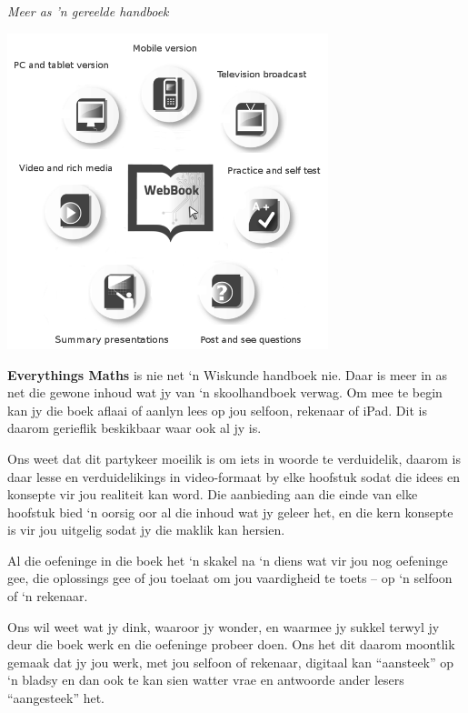 
\newpage
\thispagestyle{empty}

{\normalfont\sffamily\fontsize{22}\normalfont\itshape Meer as 'n gereelde handboek} \par

\begin{center}
\includegraphics[width=0.70\textwidth]{title_images/morethantextbook.png}
\end{center}

\par
{
\textbf{Everythings Maths} is nie net ‘n Wiskunde handboek nie. Daar is meer in as net die gewone inhoud wat jy van ‘n skoolhandboek verwag. Om mee te begin kan jy die boek aflaai of aanlyn lees op jou selfoon, rekenaar of iPad. Dit is daarom gerieflik beskikbaar waar ook al jy is.\par

Ons weet dat dit partykeer moeilik is om iets in woorde te verduidelik, daarom is daar lesse en verduidelikings in video-formaat by elke hoofstuk sodat die idees en konsepte vir jou realiteit kan word. Die aanbieding aan die einde van elke hoofstuk bied ‘n oorsig oor al die inhoud wat jy geleer het, en die kern konsepte is vir jou uitgelig sodat jy die maklik kan hersien. \par

Al die oefeninge in die boek het ‘n skakel na ‘n diens wat vir jou nog oefeninge gee, die oplossings gee of jou toelaat om jou vaardigheid te toets – op ‘n selfoon of ‘n rekenaar. \par

Ons wil weet wat jy dink, waaroor jy wonder, en waarmee jy sukkel terwyl jy deur die boek werk en die oefeninge probeer doen. Ons het dit daarom moontlik gemaak dat jy jou werk, met jou selfoon of rekenaar, digitaal kan “aansteek” op ‘n bladsy en dan ook te kan sien watter vrae en antwoorde ander lesers “aangesteek” het. \par



}




